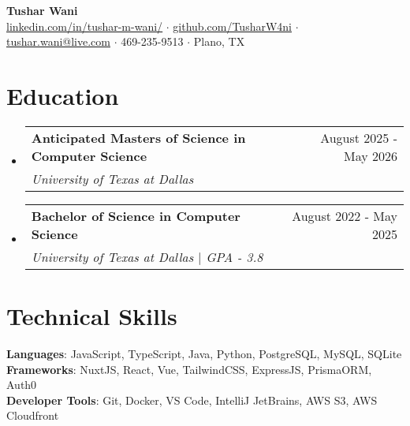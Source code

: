 \documentclass[letterpaper,11pt]{article}
\makeatletter
\newcommand{\resumeSubheading}[4]{
  \vspace{-2pt}\item
    \begin{tabular*}{0.97\textwidth}[t]{l@{\extracolsep{\fill}}r}
      \textbf{#1} & #2 \\
      \textit{\small#3} & \textit{\small #4} \\
    \end{tabular*}\vspace{-7pt}
}
\newcommand{\resumeSubHeadingListStart}{\begin{itemize}[leftmargin=0.15in, label={}]}
\newcommand{\resumeSubHeadingListEnd}{\end{itemize}}
\newcommand{\resumeItemListStart}{\begin{itemize}}
\newcommand{\resumeItemListEnd}{\end{itemize}\vspace{-5pt}}
\makeatother
\begin{document}
\begin{center}
    \textbf{\Huge Tushar Wani} \\ \vspace{1pt}
    \small \href{https://www.linkedin.com/in/tushar-m-wani/}{\underline{linkedin.com/in/tushar-m-wani/}}
    $\cdot$ \small \href{https://github.com/TusharW4ni}{\underline{github.com/TusharW4ni}}
    $\cdot$ \href{mailto:tushar.wani@live.com}{\underline{tushar.wani@live.com}} $\cdot$ \small 469-235-9513
    $\cdot$ \small Plano, TX
\end{center}



\section{Education}
  \resumeSubHeadingListStart
    \resumeSubheading
      {Anticipated Masters of Science in Computer Science}{August 2025 - May 2026}
      {University of Texas at Dallas}{}
  \resumeSubHeadingListEnd

  \resumeSubHeadingListStart
    \resumeSubheading
      {Bachelor of Science in Computer Science}{August 2022 - May 2025}
      {University of Texas at Dallas $|$ GPA - 3.8}{}
  \resumeSubHeadingListEnd

\section{Technical Skills}
 \begin{itemize}[leftmargin=0.15in, label={}]
    \small{\item{
     \textbf{Languages}{: JavaScript, TypeScript, Java, Python, PostgreSQL, MySQL, SQLite} \\
     \textbf{Frameworks}{: NuxtJS, React, Vue, TailwindCSS, ExpressJS, PrismaORM, Auth0} \\
     \textbf{Developer Tools}{: Git, Docker, VS Code, IntelliJ JetBrains, AWS S3, AWS Cloudfront} \\
    }}
 \end{itemize}

\end{document}
